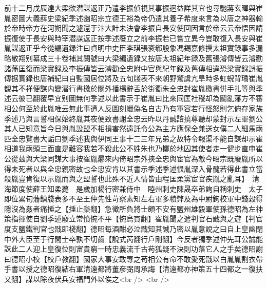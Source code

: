 前十二月戊辰達大梁欲潜謀返正乃遣李振偵視其事振迴益詳其宜也尋馳蔣玄暉與崔胤密圖大義薛史梁紀季述幽昭宗立德王裕為帝仍遣其養子希度來言為以唐之神器輸於帝時帝方在河朔聞之遽還于汴大計未決會李振自長安使回因言於帝云云帝悟因請振復使于長安與時宰潜謀返正按季述廢立之前李振若已嘗立異今豈敢復入長安與崔胤謀返正乎今從編遺録注曰貞明中史臣李琪張衮郗殷象馮錫嘉修撰太祖實録事多漏略敬翔别纂成三十卷補其闕號曰大梁編遺録又按唐太祖紀年録及舊張濬傳皆云濬勸諸藩匡復而梁實録及李振傳皆云濬勸全忠附中官與紀年録及舊傳相違恐梁實録誤振傳据實録也唐補紀曰自監國居位將及五旬牋表不來朝野驚虞亢旱時多虹蜺背璚崔胤覩其不祥便謀内變潜行書檄於關外播楊辭舌於街衢朱全忠封崔胤檄書併手扎等與季述云彼已翻覆早宜别圖無何季述以此書示于崔胤曰比來同匡社稷却為鬭亂藩方不審相公何至於此胤唯云無此事遭人反圖刻蠟偽名自古乃有軍容若行怪怒則乞俯存家族季述乃與言誓相保始終胤其夜便致書謝全忠云昨以丹誠諮撓尊聽却蒙封示左軍劉公其人已知意旨今日與胤設盟不相損害然遠託令公為主方應保全兼送女僕二人細馬兩匹全忠覧書大詬曰劉季述我與伊同王事十二三年兄弟之故特令報渠不能自謀却示崔相道我兩頭三面直是難容我若不殺此公不姓朱也乃擲於地囚其使者走一健步直申崔公從兹與大梁同謀大事按崔胤曏來内倚昭宗外挾全忠與宦官為敵今昭宗既廢胤所以得未死者以與全忠親密故也全忠安肯以其書示季述季述恨胤深入骨髓若得此書立當殺胤豈肯復以示胤而與之盟誓也此殊不近人情皆由程匡柔黨宦官疾胤之亂耳】　清海節度使薛王知柔薨　是歲加楊行密兼侍中　睦州刺史陳晟卒弟詢自稱刺史　太子即位累旬藩鎮牋表多不至王仲先性苛察素知左右軍多積弊及為中尉鉤校軍中錢穀得隱沒為姦者痛捶之【捶止橤翻】急徵所負將士頗不安有鹽州雄毅軍使孫德昭為左神策指揮使自劉季述廢立常憤惋不平【惋烏貫翻】崔胤聞之遣判官石戩與之遊【判官度支鹽鐵判官也戩即棧翻】德昭每酒酣必泣戩知其誠乃密以胤意說之曰自上皇幽閉中外大臣至于行間士卒孰不切齒【說式芮翻行戶剛翻】今反者獨季述仲先耳公誠能誅此二人迎上皇復位則富貴窮一時忠義流千古苟狐疑不決則功落它人之手矣德昭謝曰德昭小校【校戶教翻】國家大事安敢專之苟相公有命不敢愛死戩以白胤胤割衣帶手書以授之德昭復結右軍清遠都將董彦弼周承誨【清遠都亦神策五十四都之一復扶又翻】謀以除夜伏兵安福門外以俟之<br />
<br />
